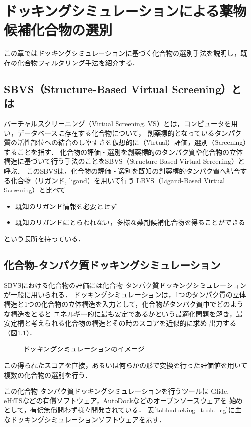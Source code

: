 \chapter{ドッキングシミュレーションによる薬物候補化合物の選別}
この章ではドッキングシミュレーションに基づく化合物の選別手法を説明し，既存の化合物フィルタリング手法を紹介する．

\section{SBVS（Structure-Based Virtual Screening）とは}
バーチャルスクリーニング（Virtual Screening, VS）とは，コンピュータを用い，データベースに存在する化合物について，
創薬標的となっているタンパク質の活性部位への結合のしやすさを仮想的に（Virtual）評価，選別（Screening）することを指す．
化合物の評価・選別を創薬標的のタンパク質や化合物の立体構造に基づいて行う手法のことをSBVS（Structure-Based Virtual Screening）と呼ぶ．
このSBVSは，化合物の評価・選別を既知の創薬標的タンパク質へ結合する化合物（リガンド, ligand）を用いて行う
LBVS（Ligand-Based Virtual Screening）と比べて
\begin{itemize}
\item 既知のリガンド情報を必要とせず
\item 既知のリガンドにとらわれない，多様な薬剤候補化合物を得ることができる
\end{itemize}
という長所を持っている．

\section{化合物-タンパク質ドッキングシミュレーション}
SBVSにおける化合物の評価には化合物-タンパク質ドッキングシミュレーションが一般に用いられる．
ドッキングシミュレーションは，1つのタンパク質の立体構造と1つの化合物の立体構造を入力として，化合物がタンパク質中でどのような構造をとると
エネルギー的に最も安定であるかという最適化問題を解き，最安定構と考えられる化合物の構造とその時のスコアを近似的に求め
出力する（図\ref{fig:docking}）．
\begin{figure}[tb]
 \begin{center}
  \caption{ドッキングシミュレーションのイメージ}
  \label{fig:docking}
 \end{center}
\end{figure}
この得られたスコアを直接，あるいは何らかの形で変換を行った評価値を用いて複数の化合物の選別を行う．

この化合物-タンパク質ドッキングシミュレーションを行うツールは
Glide\cite{Friesner2004}, eHiTS\cite{Zsoldos2007}などの有償ソフトウェア，AutoDock\cite{Morris2009}などのオープンソースウェアを
始めとして，有償無償問わず様々開発されている．
表\ref{table:docking_tools_eg}に主なドッキングシミュレーションソフトウェアを示す．

